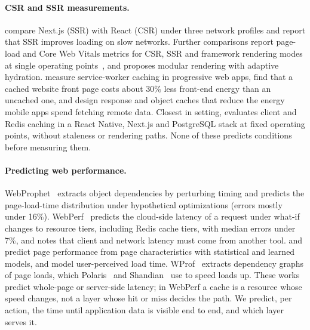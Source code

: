\documentclass[acmsmall,review,nonacm]{acmart}
\begin{document}
\paragraph{CSR and SSR measurements.}
\citet{pati2025nextjs} compare Next.js (SSR) with React (CSR) under three network profiles and report that SSR improves loading on slow networks. Further comparisons report page-load and Core Web Vitals metrics for CSR, SSR and framework rendering modes at single operating points~\cite{iskandar2020csr,hanafi2024nextjs,savenko2025nextjs,ramadhan2026nextjs,cahyono2026csr}, and \citet{chen2025mrah} proposes modular rendering with adaptive hydration. \citet{malavolta2020pwa} measure service-worker caching in progressive web apps, \citet{kalliola2026energy} find that a cached website front page costs about 30\% less front-end energy than an uncached one, and \citet{dutta2017mobilecache} design response and object caches that reduce the energy mobile apps spend fetching remote data. Closest in setting, \citet{gopal2026caching} evaluates client and Redis caching in a React Native, Next.js and PostgreSQL stack at fixed operating points, without staleness or rendering paths. None of these predicts conditions before measuring them.

\paragraph{Predicting web performance.}
WebProphet~\cite{li2010webprophet} extracts object dependencies by perturbing timing and predicts the page-load-time distribution under hypothetical optimizations (errors mostly under 16\%). WebPerf~\cite{jiang2016webperf} predicts the cloud-side latency of a request under what-if changes to resource tiers, including Redis cache tiers, with median errors under 7\%, and notes that client and network latency must come from another tool. \citet{ramakrishnan2020predictive} and \citet{ghattas2025webperf} predict page performance from page characteristics with statistical and learned models, and \citet{kelton2020userplt} model user-perceived load time. WProf~\cite{wang2013wprof} extracts dependency graphs of page loads, which Polaris~\cite{netravali2016polaris} and Shandian~\cite{wang2016shandian} use to speed loads up. These works predict whole-page or server-side latency; in WebPerf a cache is a resource whose speed changes, not a layer whose hit or miss decides the path. We predict, per action, the time until application data is visible end to end, and which layer serves it.
\end{document}
